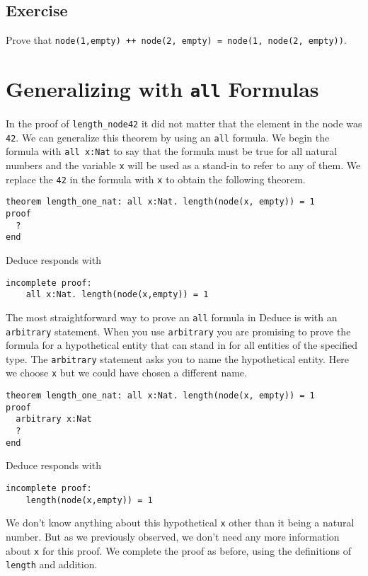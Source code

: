 \documentclass[12pt]{article}
\begin{document}
\subsection*{Exercise}

Prove that \texttt{node(1,empty) ++ node(2, empty) = node(1, node(2, empty))}.


\section{Generalizing with \texttt{all} Formulas}

In the proof of \texttt{length\_node42} it did not matter that the
element in the node was \texttt{42}. We can generalize this theorem by
using an \texttt{all} formula. We begin the formula with \texttt{all
  x:Nat} to say that the formula must be true for all natural numbers
and the variable \texttt{x} will be used as a stand-in to refer to any
of them.  We replace the \texttt{42} in the formula with \texttt{x} to
obtain the following theorem.

\begin{verbatim}
theorem length_one_nat: all x:Nat. length(node(x, empty)) = 1
proof
  ?
end
\end{verbatim}
Deduce responds with
\begin{verbatim}
incomplete proof:
    all x:Nat. length(node(x,empty)) = 1
\end{verbatim}

The most straightforward way to prove an \texttt{all} formula in
Deduce is with an \texttt{arbitrary} statement. When you use
\texttt{arbitrary} you are promising to prove the formula for a
hypothetical entity that can stand in for all entities of the
specified type. The \texttt{arbitrary} statement asks you to name the
hypothetical entity. Here we choose \texttt{x} but we could have
chosen a different name.

\begin{verbatim}
theorem length_one_nat: all x:Nat. length(node(x, empty)) = 1
proof
  arbitrary x:Nat
  ?
end
\end{verbatim}

\noindent Deduce responds with

\begin{verbatim}
incomplete proof:
    length(node(x,empty)) = 1
\end{verbatim}

We don't know anything about this hypothetical \texttt{x} other than
it being a natural number. But as we previously observed, we don't
need any more information about \texttt{x} for this proof.  We
complete the proof as before, using the definitions of \texttt{length}
and addition.
\end{document}
